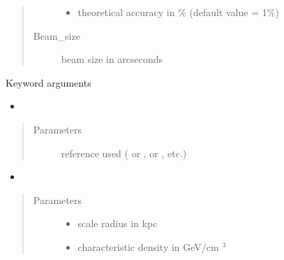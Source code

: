 \documentclass[letterpaper,10pt,english]{sphinxmanual}
\begin{document}
\begin{fulllineitems}
\begin{quote}
\begin{description}
\begin{itemize}
\item {} 
\sphinxAtStartPar
{} \textendash{} theoretical accuracy in \% (default value = 1\%)

\end{itemize}

\item[{Beam\_size}] \leavevmode
\sphinxAtStartPar
beam size in arcseconds

\end{description}\end{quote}

\sphinxAtStartPar
Keyword arguments
\begin{itemize}
\item {} 
\sphinxAtStartPar
{}

\end{itemize}
\begin{quote}\begin{description}
\item[{Parameters}] \leavevmode
\sphinxAtStartPar
{} \textendash{} reference used ( or \sphinxcode{\sphinxupquote{\textquotesingle{}1309.2641\textquotesingle{}}},  or \sphinxcode{\sphinxupquote{\textquotesingle{}1408.0002\textquotesingle{}}}, etc.)

\end{description}\end{quote}
\begin{itemize}
\item {} 
\sphinxAtStartPar
{}

\end{itemize}
\begin{quote}\begin{description}
\item[{Parameters}] \leavevmode\begin{itemize}
\item {} 
\sphinxAtStartPar
{} \textendash{} scale radius in kpc

\item {} 
\sphinxAtStartPar
{} \textendash{} characteristic density in GeV/cm \({}^3\)


\end{itemize}
\end{description}
\end{quote}
\end{fulllineitems}
\end{document}
